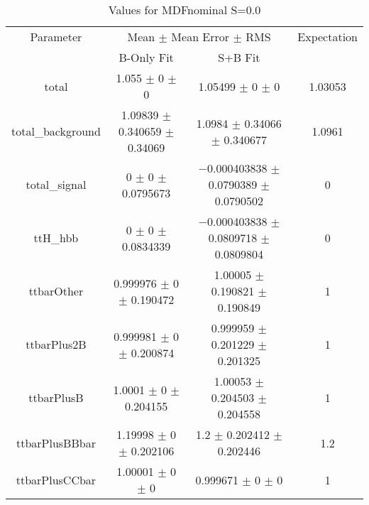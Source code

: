 \begin{table}
\centering
\caption{Values for MDFnominal S=0.0}
\begin{tabular}{cccc}
\toprule
Parameter & \multicolumn{2}{c}{Mean $\pm$ Mean Error $\pm$ RMS} & Expectation\\
 & B-Only Fit & S+B Fit & \\
\midrule
total & \num{1.055} $\pm$ \num{0} $\pm$ \num{0} & \num{1.05499} $\pm$ \num{0} $\pm$ \num{0} & \num{1.03053}\\
total\_background & \num{1.09839} $\pm$ \num{0.340659} $\pm$ \num{0.34069} & \num{1.0984} $\pm$ \num{0.34066} $\pm$ \num{0.340677} & \num{1.0961}\\
total\_signal & \num{0} $\pm$ \num{0} $\pm$ \num{0.0795673} & \num{-0.000403838} $\pm$ \num{0.0790389} $\pm$ \num{0.0790502} & \num{0}\\
ttH\_hbb & \num{0} $\pm$ \num{0} $\pm$ \num{0.0834339} & \num{-0.000403838} $\pm$ \num{0.0809718} $\pm$ \num{0.0809804} & \num{0}\\
ttbarOther & \num{0.999976} $\pm$ \num{0} $\pm$ \num{0.190472} & \num{1.00005} $\pm$ \num{0.190821} $\pm$ \num{0.190849} & \num{1}\\
ttbarPlus2B & \num{0.999981} $\pm$ \num{0} $\pm$ \num{0.200874} & \num{0.999959} $\pm$ \num{0.201229} $\pm$ \num{0.201325} & \num{1}\\
ttbarPlusB & \num{1.0001} $\pm$ \num{0} $\pm$ \num{0.204155} & \num{1.00053} $\pm$ \num{0.204503} $\pm$ \num{0.204558} & \num{1}\\
ttbarPlusBBbar & \num{1.19998} $\pm$ \num{0} $\pm$ \num{0.202106} & \num{1.2} $\pm$ \num{0.202412} $\pm$ \num{0.202446} & \num{1.2}\\
ttbarPlusCCbar & \num{1.00001} $\pm$ \num{0} $\pm$ \num{0} & \num{0.999671} $\pm$ \num{0} $\pm$ \num{0} & \num{1}\\
\bottomrule
\end{tabular}
\end{table}
